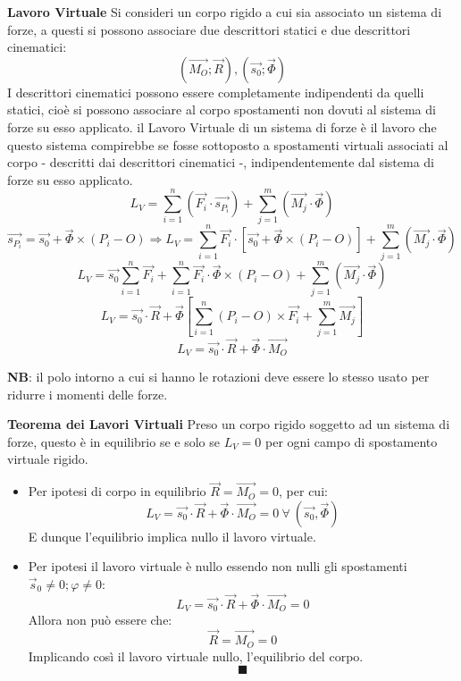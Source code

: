 \documentclass{article}
\begin{document}
\begin{adjustwidth}{2in}{}
{\Large \textbf{Lavoro Virtuale}} \mbox{} \newline
Si consideri un corpo rigido a cui sia associato un sistema di forze, a questi si possono associare due descrittori statici e due descrittori cinematici: 
\[ (\vec{M_{O}}; \vec{R}), (\vec{s_{0}}; \vec{\Phi})\]
I descrittori cinematici possono essere completamente indipendenti da quelli statici, cioè si possono associare al corpo spostamenti non dovuti al sistema di forze su esso applicato. \newline
il Lavoro Virtuale di un sistema di forze è il lavoro che questo sistema compirebbe se fosse sottoposto a spostamenti virtuali associati al corpo - descritti dai descrittori cinematici -, indipendentemente dal sistema di forze su esso applicato.
\begin{equation}
	L_{V} = \sum_{i=1}^{n}(\vec{F_{i}} \cdot \vec{s_{P_{i}}}) + \sum_{j=1}^{m}(\vec{M_{j}} \cdot \vec{\Phi})
\end{equation} 
\[ 
\vec{s_{P_{i}}} = \vec{s_{0}} + \vec{\Phi} \times (P_{i} - O) \Rightarrow L_{V} = \sum_{i=1}^{n}{\vec{F_{i}} \cdot [\vec{s_{0}} + \vec{\Phi} \times (P_{i} - O)]} + \sum_{j=1}^{m}(\vec{M_{j}} \cdot \vec{\Phi})
\]
\[
L_{V} = \vec{s_{0}}\sum_{i=1}^{n}\vec{F_{i}} + \sum_{i=1}^{n}\vec{F_{i}} \cdot \vec{\Phi} \times (P_{i} - O) + \sum_{j=1}^{m}(\vec{M_{j}} \cdot \vec{\Phi})
\]
\[
L_{V} = \vec{s_{0}} \cdot \vec{R} + \vec{\Phi} \left[\sum_{i=1}^{n}(P_{i} - O) \times \vec{F_{i}} + \sum_{j=1}^{m}\vec{M_{j}}\right]
\]
\begin{equation}
L_{V} = \vec{s_{0}} \cdot \vec{R} + \vec{\Phi} \cdot \vec{M_{O}}	
\end{equation} 

{\Large \textbf{NB}}: il polo intorno a cui si hanno le rotazioni deve essere lo stesso usato per ridurre i momenti delle forze. \newline


\textbf{Teorema dei Lavori Virtuali} \mbox{} \newline
Preso un corpo rigido soggetto ad un sistema di forze, questo è in equilibrio se e solo se $L_{V} = 0$ per ogni campo di spostamento virtuale rigido. \newline
\begin{itemize}
\item Per ipotesi di corpo in equilibrio $\vec{R} = \vec{M_{O}} = 0$, per cui:
\[
L_{V} = \vec{s_{0}} \cdot \vec{R} + \vec{\Phi} \cdot \vec{M_{O}} = 0 ~ \forall ~(\vec{s_{0}},\vec{\Phi} )
\] 
E dunque l'equilibrio implica nullo il lavoro virtuale.
\item Per ipotesi il lavoro virtuale è nullo essendo non nulli gli spostamenti \newline $\vec{s}_0 \ne 0; \varphi \ne 0$:
 \[L_{V} = \vec{s_{0}} \cdot \vec{R} + \vec{\Phi} \cdot \vec{M_{O}} = 0\]
  Allora non può essere che: 
\[
\vec{R} = \vec{M_{O}} = 0
\]
Implicando così il lavoro virtuale nullo, l'equilibrio del corpo.
\[\blacksquare\]
\end{itemize}


\end{adjustwidth}
\end{document}
